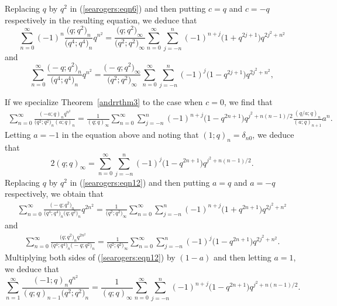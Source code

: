 \documentclass[10pt,a4paper]{amsart}
\numberwithin{equation}{section}
\begin{document}
Replacing $q$ by $q^2$ in (\ref{searogers:eqn6}) and then putting $c=q$ and $c=-q$ respectively in the resulting equation, we deduce that
\begin{equation*}%
\sum_{n=0}^\infty (-1)^n \frac{\bigl(q; q^2\bigr)_n }{\bigl(q^4; q^4\bigr)_n} q^{n^2}
=\frac{\bigl(q; q^2\bigr)_\infty}{\bigl(q^2; q^2\bigr)_\infty}
\sum_{n=0}^\infty \sum_{j=-n}^n (-1)^{n+j} \bigl(1+q^{2j+1}\bigr) q^{2j^2+n^2}
\end{equation*}
and
\begin{equation*}%
	\sum_{n=0}^\infty \frac{\bigl(-q; q^2\bigr)_n }{\bigl(q^4; q^4\bigr)_n} q^{n^2}
	=\frac{\bigl(-q; q^2\bigr)_\infty}{\bigl(q^2; q^2\bigr)_\infty}
	\sum_{n=0}^\infty \sum_{j=-n}^n (-1)^{j} \bigl(1-q^{2j+1}\bigr) q^{2j^2+n^2},
\end{equation*}

If we specialize Theorem~\ref{andrrthm3} to the case when $c=0$, we find that
\begin{align}\label{searogers:eqn12}
\sum_{n=0}^\infty \frac{(-a; q)_n q^{n^2}}{\bigl(q^2; q^2\bigr)_n (a; q)_n}
=\frac{1}{(q; q)_\infty} \sum_{n=0}^\infty \sum_{j=-n}^n (-1)^{n+j}\bigl(1-q^{2n+1}\bigr) q^{j^2+n(n-1)/2}
\frac{(q/a; q)_n }{(a; q)_{n+1}}a^n. 	
\end{align}
Letting $a=-1$ in the equation above and noting that $(1; q)_n=\delta_{n0}$, we deduce that
\begin{equation*}%
2(q; q)_\infty=\sum_{n=0}^\infty \sum_{j=-n}^n (-1)^{j}\bigl(1-q^{2n+1}\bigr) q^{j^2+n(n-1)/2}.	
\end{equation*}
Replacing $q$ by $q^2$ in (\ref{searogers:eqn12}) and then putting $a=q$ and $a=-q$ respectively, we obtain that
\begin{align*}%
\sum_{n=0}^\infty \frac{\bigl(-q; q^2\bigr)_n}{\bigl(q^4; q^4\bigr)_n \bigl(q; q^2\bigr)_n} q^{2n^2}
=\frac{1}{\bigl(q^2; q^2\bigr)_\infty}
\sum_{n=0}^\infty \sum_{j=-n}^n (-1)^{n+j}\bigl(1+q^{2n+1}\bigr) q^{2j^2+n^2}
\end{align*}
and
\begin{align*}%
	\sum_{n=0}^\infty \frac{\bigl(q; q^2\bigr)_n q^{2n^2}}{\bigl(q^4; q^4\bigr)_n \bigl(-q; q^2\bigr)_n}
	=\frac{1}{\bigl(q^2; q^2\bigr)_\infty}
	\sum_{n=0}^\infty \sum_{j=-n}^n (-1)^{j}\bigl(1-q^{2n+1}\bigr) q^{2j^2+n^2}.
\end{align*}
Multiplying both sides of (\ref{searogers:eqn12}) by $(1-a)$ and then letting $a=1$, we deduce that
\begin{equation*}%
\sum_{n=1}^\infty \frac{(-1; q)_n q^{n^2}}{(q; q)_{n-1} \bigl(q^2; q^2\bigr)_n}=\frac{1}{(q; q)_\infty} \sum_{n=0}^\infty \sum_{j=-n}^n (-1)^{n+j}\bigl(1-q^{2n+1}\bigr) q^{j^2+n(n-1)/2}.
\end{equation*}
\end{document}
